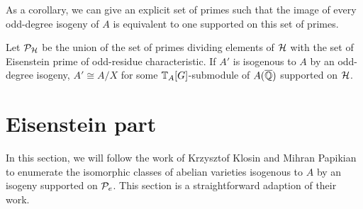 \documentclass[thesis.tex]{subfiles}
\begin{document}
As a corollary, we can give an explicit set of primes such that the image of every
odd-degree isogeny of $A$ is equivalent to one supported on this set of primes.
\begin{corollary}
    Let $\P_\H$ be the union of the set of primes dividing elements of $\H$ with
    the set of Eisenstein prime of odd-residue characteristic. If $A'$ is
    isogenous to $A$ by an odd-degree isogeny, $A'\cong A/X$ for some
    $\TT_A[G]$-submodule of $A(\QQbar)$ supported on $\H$.
\end{corollary}

\section{Eisenstein part}%
\label{sec:eisenstein_part}

In this section, we will follow the work of Krzysztof Klosin and Mihran
Papikian to enumerate the isomorphic classes of abelian varieties isogenous to
$A$ by an isogeny supported on $\P_e$. This section is a straightforward
adaption of their work.
\end{document}
